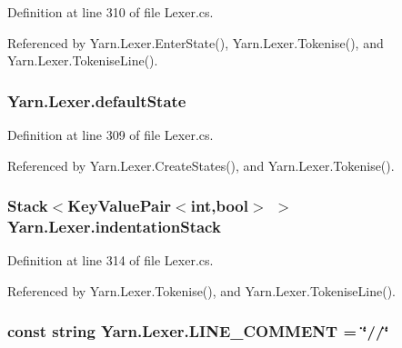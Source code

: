 Definition at line 310 of file Lexer.\-cs.



Referenced by Yarn.\-Lexer.\-Enter\-State(), Yarn.\-Lexer.\-Tokenise(), and Yarn.\-Lexer.\-Tokenise\-Line().

\hypertarget{a00127_a16b5dbf27a377cde5e8ba0eaa05b5710}{
\subsubsection[{default\-State}]{ Yarn.\-Lexer.\-default\-State\hspace{0.3cm}{\ttfamily [private]}}}\label{a00127_a16b5dbf27a377cde5e8ba0eaa05b5710}


Definition at line 309 of file Lexer.\-cs.



Referenced by Yarn.\-Lexer.\-Create\-States(), and Yarn.\-Lexer.\-Tokenise().

\hypertarget{a00127_a6631a1b1a9109258ab18927e7587ff9b}{
\subsubsection[{indentation\-Stack}]{\setlength{\rightskip}{0pt plus 5cm}Stack$<$Key\-Value\-Pair$<$int,bool$>$ $>$ Yarn.\-Lexer.\-indentation\-Stack\hspace{0.3cm}{\ttfamily [private]}}}\label{a00127_a6631a1b1a9109258ab18927e7587ff9b}


Definition at line 314 of file Lexer.\-cs.



Referenced by Yarn.\-Lexer.\-Tokenise(), and Yarn.\-Lexer.\-Tokenise\-Line().

\hypertarget{a00127_a29c457125cc4876f8571f5d9afa372e2}{
\subsubsection[{L\-I\-N\-E\-\_\-\-C\-O\-M\-M\-E\-N\-T}]{\setlength{\rightskip}{0pt plus 5cm}const string Yarn.\-Lexer.\-L\-I\-N\-E\-\_\-\-C\-O\-M\-M\-E\-N\-T = \char`\"{}//\char`\"{}\hspace{0.3cm}{\ttfamily [private]}}}\label{a00127_a29c457125cc4876f8571f5d9afa372e2}


